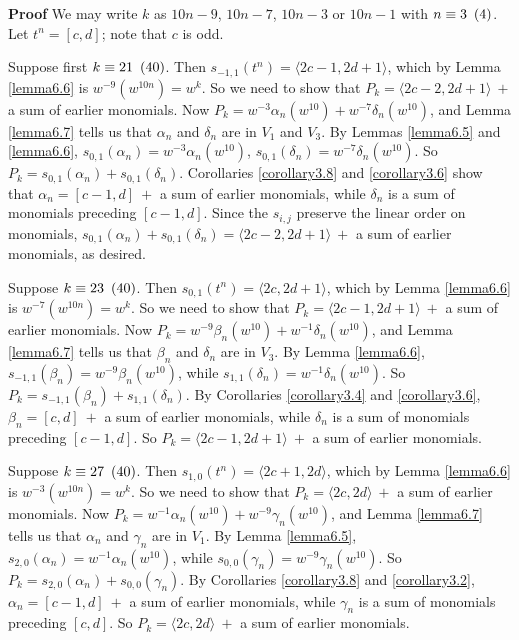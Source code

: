 \documentclass{monsky2009}
\newenvironment{proof}[1][]{\textbf{Proof #1\hspace{.3em}}}{}
\newcommand{\mod}[1]{\ensuremath{\hspace{.5em}(#1)}}
\begin{document}
\begin{proof}
We may write $k$ as $10n-9$, $10n-7$, $10n-3$ or $10n-1$ with $n\equiv 3\mod{4}$. Let $t^{n}=[c,d]$; note that $c$ is odd.

Suppose first $k\equiv 21\mod{40}$. Then $s_{-1,1}(t^{n})=\langle 2c-1,2d+1\rangle$, which by Lemma \ref{lemma6.6} is $w^{-9}(w^{10n})=w^{k}$. So we need to show that $P_{k}=\langle 2c-2,2d+1\rangle \ +$ a sum of earlier monomials. Now $P_{k}=w^{-3}\alpha_{n}(w^{10})+w^{-7}\delta_{n}(w^{10})$, and Lemma \ref{lemma6.7} tells us that $\alpha_{n}$ and $\delta_{n}$ are in $V_{1}$ and $V_{3}$. By Lemmas \ref{lemma6.5} and \ref{lemma6.6}, $s_{0,1}(\alpha_{n})=w^{-3}\alpha_{n}(w^{10})$, $s_{0,1}(\delta_{n})=w^{-7}\delta_{n}(w^{10})$. So $P_{k}=s_{0,1}(\alpha_{n})+s_{0,1}(\delta_{n})$. Corollaries \ref{corollary3.8} and \ref{corollary3.6} show that $\alpha_{n}=[c-1,d]\ +$ a sum of earlier monomials, while $\delta_{n}$ is a sum of monomials preceding $[c-1,d]$. Since the $s_{i,j}$ preserve the linear order on monomials, $s_{0,1}(\alpha_{n})+s_{0,1}(\delta_{n})=\langle 2c-2,2d+1\rangle\ +$ a sum of earlier monomials, as desired.

Suppose $k\equiv 23\mod{40}$. Then $s_{0,1}(t^{n})=\langle 2c,2d+1\rangle$, which by Lemma \ref{lemma6.6} is $w^{-7}(w^{10n})=w^{k}$. So we need to show that $P_{k}=\langle 2c-1,2d+1\rangle \ +$ a sum of earlier monomials. Now $P_{k}=w^{-9}\beta_{n}(w^{10})+w^{-1}\delta_{n}(w^{10})$, and Lemma \ref{lemma6.7} tells us that $\beta_{n}$ and $\delta_{n}$ are in $V_{3}$. By Lemma \ref{lemma6.6}, $s_{-1,1}(\beta_{n})=w^{-9}\beta_{n}(w^{10})$, while  $s_{1,1}(\delta_{n})=w^{-1}\delta_{n}(w^{10})$. So $P_{k}=s_{-1,1}(\beta_{n})+s_{1,1}(\delta_{n})$. By Corollaries \ref{corollary3.4} and \ref{corollary3.6}, $\beta_{n}=[c,d]\ +$ a sum of earlier monomials, while $\delta_{n}$ is a sum of monomials preceding $[c-1,d]$. So $P_{k}=\langle 2c-1,2d+1\rangle\ +$ a sum of earlier monomials.

Suppose $k\equiv 27\mod{40}$. Then $s_{1,0}(t^{n})=\langle 2c+1,2d\rangle$, which by Lemma \ref{lemma6.6} is $w^{-3}(w^{10n})=w^{k}$. So we need to show that $P_{k}=\langle 2c,2d\rangle \ +$ a sum of earlier monomials. Now $P_{k}=w^{-1}\alpha_{n}(w^{10})+w^{-9}\gamma_{n}(w^{10})$, and Lemma \ref{lemma6.7} tells us that $\alpha_{n}$ and $\gamma_{n}$ are in $V_{1}$. By Lemma \ref{lemma6.5}, $s_{2,0}(\alpha_{n})=w^{-1}\alpha_{n}(w^{10})$, while  $s_{0,0}(\gamma_{n})=w^{-9}\gamma_{n}(w^{10})$. So $P_{k}=s_{2,0}(\alpha_{n})+s_{0,0}(\gamma_{n})$. By Corollaries \ref{corollary3.8} and \ref{corollary3.2}, $\alpha_{n}=[c-1,d]\ +$ a sum of earlier monomials, while $\gamma_{n}$ is a sum of monomials preceding $[c,d]$. So $P_{k}=\langle 2c,2d\rangle\ +$ a sum of earlier monomials.


\end{proof}
\end{document}
